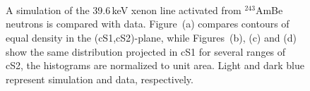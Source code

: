 
\appendix*

\section{}

\begin{figure}[h!]
	 \\
	\caption{A simulation of the 39.6\,keV  xenon line activated from $^{243}$AmBe neutrons is compared with  data.
		 Figure~(a) compares contours of equal density in the (cS1,cS2)-plane, while Figures~(b), (c) and (d) show the same distribution projected in cS1 for
		 several ranges of cS2, the histograms are normalized to unit area. Light and dark blue represent simulation and data, respectively.
		}
		
  \label{fig:mc_comp}
\end{figure}

